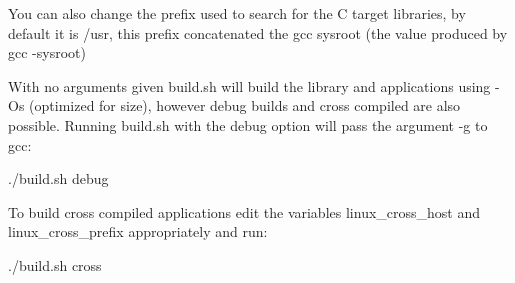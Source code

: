 You can also change the prefix used to search for the C target libraries, by default it is {\ttfamily /usr}, this prefix concatenated the gcc sysroot (the value produced by {\ttfamily gcc -\/sysroot})

With no arguments given {\ttfamily build.\+sh} will build the library and applications using {\ttfamily -\/\+Os} (optimized for size), however debug builds and cross compiled are also possible. Running {\ttfamily build.\+sh} with the {\ttfamily debug} option will pass the argument {\ttfamily -\/g} to gcc\+: \begin{DoxyVerb}./build.sh debug
\end{DoxyVerb}


To build cross compiled applications edit the variables {\ttfamily linux\+\_\+cross\+\_\+host} and {\ttfamily linux\+\_\+cross\+\_\+prefix} appropriately and run\+: \begin{DoxyVerb}./build.sh cross\end{DoxyVerb}
 